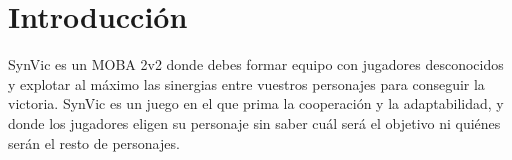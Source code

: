 \section{Introducción}

SynVic es un MOBA 2v2 donde debes formar equipo con jugadores desconocidos y explotar al máximo las sinergias entre vuestros personajes para conseguir la victoria. SynVic es un juego en el que prima la cooperación y la adaptabilidad, y donde los jugadores eligen su personaje sin saber cuál será el objetivo ni quiénes serán el resto de personajes.